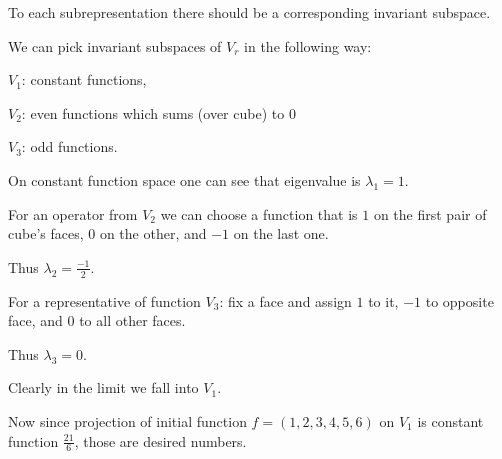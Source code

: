 \documentclass{beamer}
\begin{document}
\begin{frame}
    To each subrepresentation there should be a corresponding invariant subspace.

    We can pick invariant subspaces of $V_r$ in the following way: 
    
    $V_1$: constant functions, 
    
    $V_2$: even functions which sums (over cube) to 0 
    
    $V_3$: odd functions.
    
 \end{frame}

 \begin{frame}
    On constant function space one can see that eigenvalue is $\lambda_1=1$. 
    
    For an operator from $V_2$ we can choose a function that is $1$ on the first pair of cube's faces, $0$ on the other, and $-1$ on the last one.
    
    Thus $\lambda_2 = \frac{-1}{2}$. 

    
    For a representative of function $V_3$: fix a face and assign $1$ to it, $-1$ to opposite face, and $0$ to all other faces. 
    
    Thus $\lambda_3 = 0$.

    Clearly in the limit we fall into $V_1$. 

    Now since projection of initial function $f = (1,2,3,4,5,6)$ on $V_1$ is constant function $\frac{21}{6}$, those are desired numbers.
 \end{frame}
\end{document}
